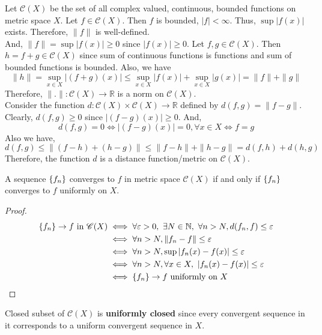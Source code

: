 \begin{commentary}
	Let $\mathscr{C}(X)$ be the set of all complex valued, continuous, bounded functions on metric space $X$.
	Let $f \in \mathscr{C}(X)$.
	Then $f$ is bounded, $|f| < \infty$.
	Thus, $\sup |f(x)|$ exists.
	Therefore, $\| f \|$ is well-defined.\\

	And, $\| f \| = \sup |f(x)| \ge 0$ since $|f(x)| \ge 0$.
	Let $f,g \in \mathscr{C}(X)$.
	Then $h = f+g \in \mathscr{C}(X)$ since sum of continuous functions is functions and sum of bounded functions is bounded.
	Also, we have
	\[ \| h \| = \sup_{x \in X} |(f+g)(x)| \le \sup_{x \in X} |f(x)| + \sup_{x \in X} |g(x)| = \| f \| + \| g \| \]
	Therefore, $\| . \| : \mathscr{C}(X) \to \mathbb{R}$ is a norm on $\mathscr{C}(X)$.\\

	Consider the function $d : \mathscr{C}(X) \times \mathscr{C}(X) \to \mathbb{R}$ defined by $d(f,g) = \| f-g \|$.
	Clearly, $d(f,g) \ge 0$ since $|(f-g)(x)| \ge 0$.
	And,
	\[ d(f,g) = 0 \iff |(f-g)(x)| = 0, \forall x \in X \iff f =g  \]
	Also we have,
	\[ d(f,g) \le \| (f-h)+(h-g) \| \le \| f-h \| + \| h-g \| =  d(f,h) + d(h,g) \]
	Therefore, the function $d$ is a distance function/metric on $\mathscr{C}(X)$.
\end{commentary}
\begin{remark}
\begin{important}
	A sequence $\left\{f_n\right\}$ converges to $f$ in metric space $\mathscr{C}(X)$ if and only if $\left\{f_n\right\}$ converges to $f$ uniformly on $X$.
\end{important}
\end{remark}
\begin{proof}
	\begin{align*}
		\left\{f_n\right\} \to f \text{ in } \mathscr{C}(X) & \iff \forall \varepsilon > 0,\ \exists N \in \mathbb{N},\ \forall n > N, d(f_n,f) \le \varepsilon\\
		& \iff \forall n > N, \| f_n - f \| \le \varepsilon \\
		& \iff \forall n > N, \sup |f_n(x)-f(x)| \le \varepsilon \\
		& \iff \forall n > N, \forall x \in X,\ |f_n(x)-f(x)| \le \varepsilon \\
		& \iff \left\{f_n\right\} \to f \text{ uniformly on } X
	\end{align*}
\end{proof}

\begin{definition}
	Closed subset of $\mathscr{C}(X)$ is \textbf{uniformly closed} since every convergent sequence in it corresponds to a uniform convergent sequence in $X$.
\end{definition}

